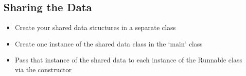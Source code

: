 \documentclass[letterpaper,10pt,openany,oneside]{sphinxmanual}
\begin{document}
\subsection{Sharing the Data}
\label{URLSpider/URLSpider:sharing-the-data}\begin{itemize}
\item {} 
Create your shared data structures in a separate class

\item {} 
Create one instance of the shared data class in the ‘main’ class

\item {} 
Pass that instance of the shared data to each instance of the Runnable class via the constructor

\end{itemize}
\end{document}
